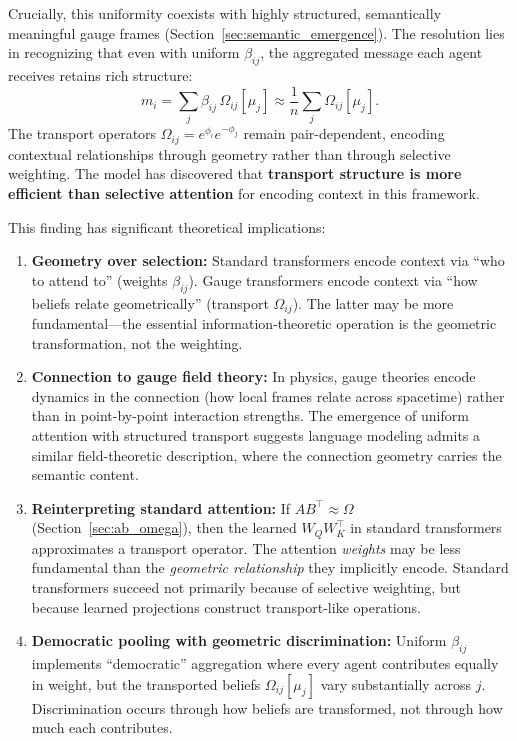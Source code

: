 \documentclass[twoside,11pt]{article}
\begin{document}
Crucially, this uniformity coexists with highly structured, semantically meaningful gauge frames (Section~\ref{sec:semantic_emergence}). The resolution lies in recognizing that even with uniform $\beta_{ij}$, the aggregated message each agent receives retains rich structure:
%
\begin{equation}
m_i = \sum_j \beta_{ij} \, \Omega_{ij}[\mu_j] \approx \frac{1}{n}\sum_j \Omega_{ij}[\mu_j].
\label{eq:uniform_aggregation}
\end{equation}
%
The transport operators $\Omega_{ij} = e^{\phi_i}e^{-\phi_j}$ remain pair-dependent, encoding contextual relationships through geometry rather than through selective weighting. The model has discovered that \textbf{transport structure is more efficient than selective attention} for encoding context in this framework.

This finding has significant theoretical implications:

\begin{enumerate}
    \item \textbf{Geometry over selection:} Standard transformers encode context via ``who to attend to'' (weights $\beta_{ij}$). Gauge transformers encode context via ``how beliefs relate geometrically'' (transport $\Omega_{ij}$). The latter may be more fundamental---the essential information-theoretic operation is the geometric transformation, not the weighting.

    \item \textbf{Connection to gauge field theory:} In physics, gauge theories encode dynamics in the connection (how local frames relate across spacetime) rather than in point-by-point interaction strengths. The emergence of uniform attention with structured transport suggests language modeling admits a similar field-theoretic description, where the connection geometry carries the semantic content.

    \item \textbf{Reinterpreting standard attention:} If $AB^\top \approx \Omega$ (Section~\ref{sec:ab_omega}), then the learned $W_Q W_K^\top$ in standard transformers approximates a transport operator. The attention \emph{weights} may be less fundamental than the \emph{geometric relationship} they implicitly encode. Standard transformers succeed not primarily because of selective weighting, but because learned projections construct transport-like operations.

    \item \textbf{Democratic pooling with geometric discrimination:} Uniform $\beta_{ij}$ implements ``democratic'' aggregation where every agent contributes equally in weight, but the transported beliefs $\Omega_{ij}[\mu_j]$ vary substantially across $j$. Discrimination occurs through how beliefs are transformed, not through how much each contributes.
\end{enumerate}
\end{document}
